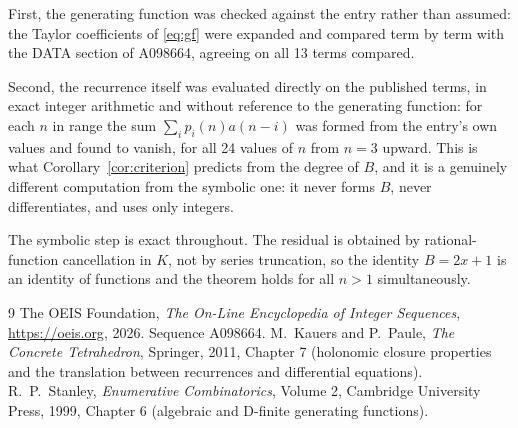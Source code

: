 \documentclass[11pt,a4paper]{article}
\theoremstyle{plain}
\theoremstyle{definition}
\begin{document}
First, the generating function was checked against the entry rather than assumed: the
Taylor coefficients of \eqref{eq:gf} were expanded and compared term by term with the DATA
section of A098664, agreeing on all 13 terms compared.

Second, the recurrence itself was evaluated directly on the published terms, in exact
integer arithmetic and without reference to the generating function: for each $n$ in range
the sum $\sum_{i}p_{i}(n)a(n-i)$ was formed from the entry's own values and found to
vanish, for all 24 values of $n$ from $n=3$ upward. This is what
Corollary~\ref{cor:criterion} predicts from the degree of $B$, and it is a genuinely
different computation from the symbolic one: it never forms $B$, never differentiates, and
uses only integers.

The symbolic step is exact throughout. The residual is obtained by rational-function
cancellation in $K$, not by series truncation, so the identity $B=2 x + 1$ is an
identity of functions and the theorem holds for all $n>1$ simultaneously.

\begin{thebibliography}{9}
 The OEIS Foundation, \emph{The On-Line Encyclopedia of Integer Sequences},
\url{https://oeis.org}, 2026. Sequence A098664.
 M.~Kauers and P.~Paule, \emph{The Concrete Tetrahedron}, Springer, 2011,
Chapter 7 (holonomic closure properties and the translation between recurrences and
differential equations).
 R.~P.~Stanley, \emph{Enumerative Combinatorics}, Volume 2, Cambridge
University Press, 1999, Chapter 6 (algebraic and D-finite generating functions).
\end{thebibliography}
\end{document}
